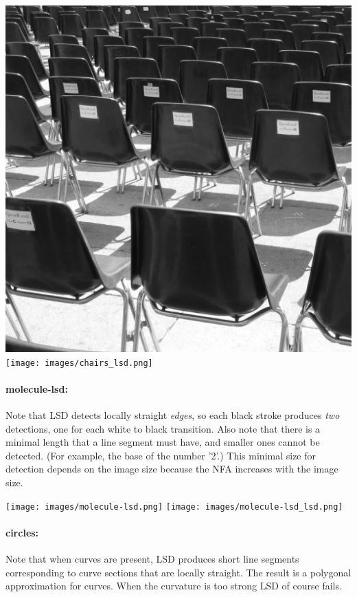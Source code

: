 \documentclass{ipol}
\begin{document}
\begin{center}
\includegraphics[scale=0.4]{images/chairs.png}
\texttt{[image: images/chairs\_lsd.png]}
\end{center}

\paragraph{molecule-lsd:} Note that LSD detects locally
straight \emph{edges}, so each black stroke produces \emph{two}
detections, one for each white to black transition. Also note that
there is a minimal length that a line segment must have, and smaller
ones cannot be detected. (For example, the base of the number '2'.)
This minimal size for detection depends on the image size because the
NFA increases with the image size.

\begin{center}
\texttt{[image: images/molecule-lsd.png]}
\texttt{[image: images/molecule-lsd\_lsd.png]}
\end{center}

\paragraph{circles:} Note that when curves are present, LSD produces
short line segments corresponding to curve sections that are locally
straight. The result is a polygonal approximation for curves. When the
curvature is too strong LSD of course fails.
\end{document}
